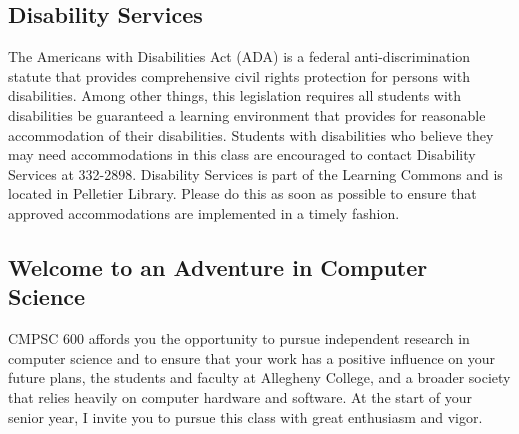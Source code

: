 \subsection*{Disability Services}
\vspace*{-.05in}

The Americans with Disabilities Act (ADA) is a federal anti-discrimination statute that provides comprehensive civil
rights protection for persons with disabilities.  Among other things, this legislation requires all students with
disabilities be guaranteed a learning environment that provides for reasonable accommodation of their disabilities.
Students with disabilities who believe they may need accommodations in this class are encouraged to contact Disability
Services at 332-2898.  Disability Services is part of the Learning Commons and is located in Pelletier Library.
Please do this as soon as possible to ensure that approved accommodations are implemented in a timely fashion.

\vspace*{-.1in}
\subsection*{Welcome to an Adventure in Computer Science}


CMPSC 600 affords you the opportunity to pursue independent research in computer science and to ensure that your work
has a positive influence on your future plans, the students and faculty at Allegheny College, and a broader society that
relies heavily on computer hardware and software.  At the start of your senior year, I invite you to pursue this class
with great enthusiasm and vigor.

%

